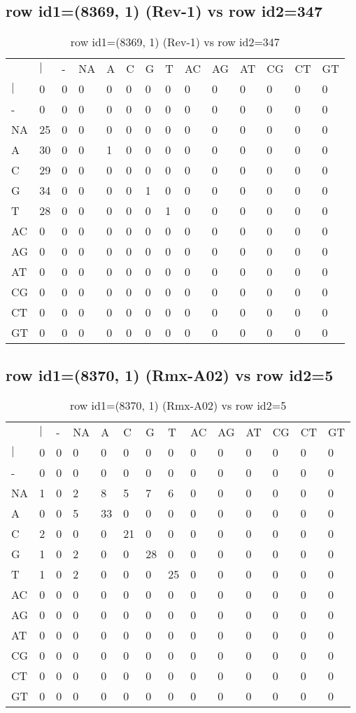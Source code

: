 \subsection{row id1=(8369, 1) (Rev-1) vs row id2=347}
\begin{center}
\begin{longtable}{|l|l|l|l|l|l|l|l|l|l|l|l|l|l|}
\caption{row id1=(8369, 1) (Rev-1) vs row id2=347} \label{table_dm408}\\
\hline
\\
\hline
&$|$&-&NA&A&C&G&T&AC&AG&AT&CG&CT&GT\\
$|$&0&0&0&0&0&0&0&0&0&0&0&0&0\\
-&0&0&0&0&0&0&0&0&0&0&0&0&0\\
NA&25&0&0&0&0&0&0&0&0&0&0&0&0\\
A&30&0&0&1&0&0&0&0&0&0&0&0&0\\
C&29&0&0&0&0&0&0&0&0&0&0&0&0\\
G&34&0&0&0&0&1&0&0&0&0&0&0&0\\
T&28&0&0&0&0&0&1&0&0&0&0&0&0\\
AC&0&0&0&0&0&0&0&0&0&0&0&0&0\\
AG&0&0&0&0&0&0&0&0&0&0&0&0&0\\
AT&0&0&0&0&0&0&0&0&0&0&0&0&0\\
CG&0&0&0&0&0&0&0&0&0&0&0&0&0\\
CT&0&0&0&0&0&0&0&0&0&0&0&0&0\\
GT&0&0&0&0&0&0&0&0&0&0&0&0&0\\
\hline
\end{longtable}
\end{center}

\subsection{row id1=(8370, 1) (Rmx-A02) vs row id2=5}
\begin{center}
\begin{longtable}{|l|l|l|l|l|l|l|l|l|l|l|l|l|l|}
\caption{row id1=(8370, 1) (Rmx-A02) vs row id2=5} \label{table_dm410}\\
\hline
\\
\hline
&$|$&-&NA&A&C&G&T&AC&AG&AT&CG&CT&GT\\
$|$&0&0&0&0&0&0&0&0&0&0&0&0&0\\
-&0&0&0&0&0&0&0&0&0&0&0&0&0\\
NA&1&0&2&8&5&7&6&0&0&0&0&0&0\\
A&0&0&5&33&0&0&0&0&0&0&0&0&0\\
C&2&0&0&0&21&0&0&0&0&0&0&0&0\\
G&1&0&2&0&0&28&0&0&0&0&0&0&0\\
T&1&0&2&0&0&0&25&0&0&0&0&0&0\\
AC&0&0&0&0&0&0&0&0&0&0&0&0&0\\
AG&0&0&0&0&0&0&0&0&0&0&0&0&0\\
AT&0&0&0&0&0&0&0&0&0&0&0&0&0\\
CG&0&0&0&0&0&0&0&0&0&0&0&0&0\\
CT&0&0&0&0&0&0&0&0&0&0&0&0&0\\
GT&0&0&0&0&0&0&0&0&0&0&0&0&0\\
\hline
\end{longtable}
\end{center}

